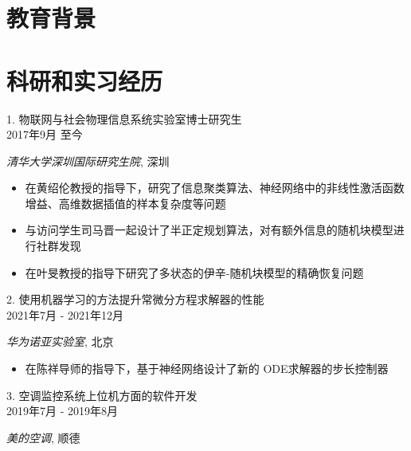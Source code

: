 \documentclass[12pt]{moderncv}
\begin{document}
\makecvtitle
\section{教育背景}
\section{科研和实习经历}

{\raggedright\large 1. 物联网与社会物理信息系统实验室博士研究生\\
\raggedleft\small \textsc{2017年9月 至今}\par\textit{清华大学深圳国际研究生院}, 深圳 \\[5pt]}

\normalsize{\begin{itemize}
		\item 在黄绍伦教授的指导下，研究了信息聚类算法、神经网络中的非线性激活函数增益、高维数据插值的样本复杂度等问题
		\item 与访问学生司马晋一起设计了半正定规划算法，对有额外信息的随机块模型进行社群发现
		\item 在叶旻教授的指导下研究了多状态的伊辛-随机块模型的精确恢复问题
\end{itemize}}

{\raggedright\large 2. 使用机器学习的方法提升常微分方程求解器的性能\\
\raggedleft\small \textsc{2021年7月 - 2021年12月}\par \textit{华为诺亚实验室}, 北京 \\[5pt]}

\normalsize{\begin{itemize}
		\item 在陈祥导师的指导下，基于神经网络设计了新的 ODE求解器的步长控制器
\end{itemize}}




{\raggedright\large 3. 空调监控系统上位机方面的软件开发 \\
\raggedleft\small \textsc{2019年7月 - 2019年8月}\par\textit{美的空调}, 顺德\\[5pt]}
\end{document}
